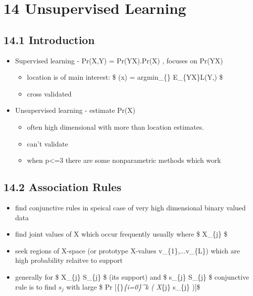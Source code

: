 \documentclass[11pt]{article}
\providecommand{\tightlist}{%
      \setlength{\itemsep}{0pt}\setlength{\parskip}{0pt}}
\begin{document}
    \section{14 Unsupervised Learning}\label{unsupervised-learning}

\subsection{14.1 Introduction}\label{introduction}

\begin{itemize}
\tightlist
\item
  Supervised learning - Pr(X,Y) = Pr(Y\textbar{}X).Pr(X) , focuses on
  Pr(Y\textbar{}X)

  \begin{itemize}
  \tightlist
  \item
    location is of main interest: \$ \mu(x) = argmin\_\{\}
    E\_\{Y\textbar{}X\}L(Y,) \$
  \item
    cross validated
  \end{itemize}
\item
  Unsupervised learning - estimate Pr(X)

  \begin{itemize}
  \tightlist
  \item
    often high dimensional with more than location estimates.
  \item
    can't validate
  \item
    when p\textless{}=3 there are some nonparametric methods which work
  \end{itemize}
\end{itemize}

\subsection{14.2 Association Rules}\label{association-rules}

\begin{itemize}
\tightlist
\item
  find conjunctive rules in speical case of very high dimensional binary
  valued data
\item
  find joint values of X which occur frequently usually where \$
  X\_\{j\}  \$
\item
  seek regions of X-space (or prototype X-values v\_\{1\},...v\_\{L\})
  which are high probability relaitve to support
\item
  generally for \$ X\_\{j\} \in S\_\{j\} \$ (its support) and \$
  s\_\{j\} \subset S\_\{j\} \$ conjunctive rule is to find \(s_{j}\)
  with large \$ Pr {[}\{\bigcap\}\emph{\{i=0\}\^{}k ( X}\{j\}
  \in s\_\{j\} ){]}\$
\end{itemize}
\end{document}
